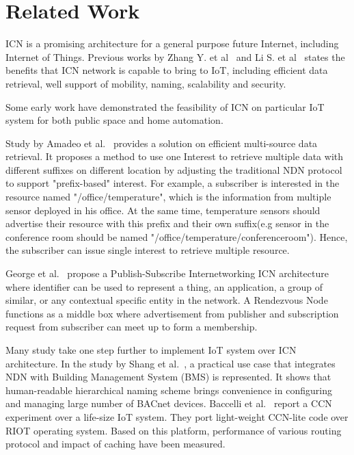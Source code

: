 \section{Related Work}
\label{sec:related}
ICN is a promising architecture for a general purpose future Internet, including Internet of Things. Previous works by Zhang Y. et al~\cite{zhang2013icn} and Li S. et al~\cite{compare_study} states the benefits that ICN network is capable to bring to IoT, including efficient data retrieval, well support of mobility, naming, scalability and security.

Some early work have demonstrated the feasibility of ICN on particular IoT system for both public space and home automation.  


Study by Amadeo et al.~\cite{amadeo2014multi} provides a solution on efficient multi-source data retrieval. It proposes a method to use one Interest to retrieve multiple data with different suffixes on different location by adjusting the traditional NDN protocol to support "prefix-based" interest. For example, a subscriber is interested in the resource named "/office/temperature", which is the information from multiple sensor deployed in his office. At the same time, temperature sensors should advertise their resource with this prefix and their own suffix(e.g sensor in the conference room should be named "/office/temperature/conferenceroom"). Hence, the subscriber can issue single interest to retrieve multiple resource.


George et al.~\cite{polyzos2015building} propose a Publish-Subscribe Internetworking ICN architecture
where identifier can be used to represent a thing, an application, a group of similar, or any contextual specific entity in the network. A Rendezvous Node functions as a middle box where advertisement from publisher and subscription request from subscriber can meet up to form a membership. 

Many study take one step further to implement IoT system over ICN architecture. In the study by Shang et al.~\cite{shang2014securing}, a practical use case that integrates NDN with Building Management System (BMS) is represented. It shows that human-readable hierarchical naming scheme brings convenience in configuring and managing large number of BACnet devices. Baccelli et al.~\cite{baccelli2014information} report a CCN experiment over a life-size IoT system. They port light-weight CCN-lite code over RIOT operating system. Based on this platform, performance of various routing protocol and impact of caching have been measured.  

